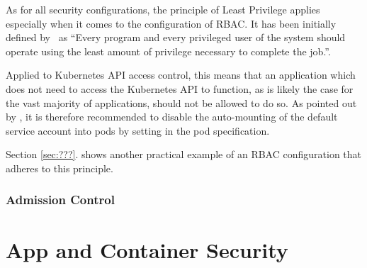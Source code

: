 As for all security configurations, the principle of Least Privilege applies especially when it comes to the configuration of RBAC. It has been initially defined by~\textcite{leastPrivilege} as \enquote{Every program and every privileged user of the system should operate using the least amount of privilege necessary to complete the job.}. 

Applied to Kubernetes API access control, this means that an application which does not need to access the Kubernetes API to function, as is likely the case for the vast majority of applications, should not be allowed to do so. As pointed out by \textcite{kubernetessecurity}, it is therefore recommended to disable the auto-mounting of the default service account into pods by setting  in the pod specification. 

Section \ref{sec:???}. shows another practical example of an RBAC configuration that adheres to this principle.



\subsubsection{Admission Control} \label{admissionControl}


\section{App and Container Security} \label{sec:layer4}

